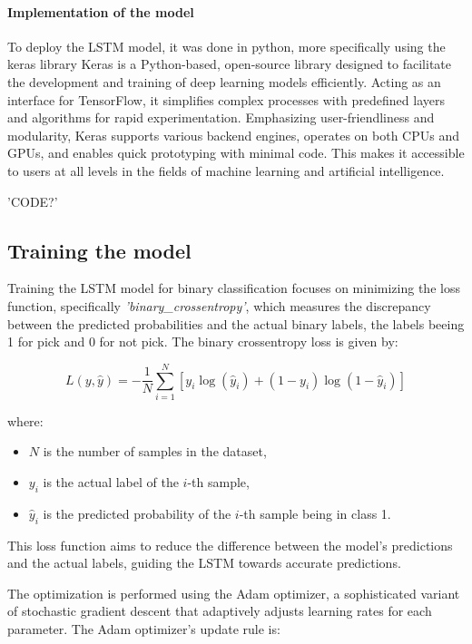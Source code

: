 \paragraph{Implementation of the model}
To deploy the LSTM model, it was done in python, more specifically using the keras library
Keras \cite{chollet2015keras} is a Python-based, open-source library designed to facilitate the development and training of deep learning models efficiently.
Acting as an interface for TensorFlow, it simplifies complex processes with predefined layers and algorithms for rapid experimentation. 
Emphasizing user-friendliness and modularity, Keras supports various backend engines, operates on both CPUs and GPUs, and enables quick prototyping with minimal code. 
This makes it accessible to users at all levels in the fields of machine learning and artificial intelligence.


'CODE?'





\subsection{Training the model}

Training the LSTM model for binary classification focuses on minimizing the loss function, specifically \textit{'binary\_crossentropy'}, which measures the discrepancy between the predicted probabilities and the actual binary labels, the labels beeing 1 for pick and 0 for not pick. 
The binary crossentropy loss is given by:

\[
L(y, \hat{y}) = -\frac{1}{N} \sum_{i=1}^{N} \left[ y_i \log(\hat{y}_i) + (1 - y_i) \log(1 - \hat{y}_i) \right]
\]

where:
\begin{itemize}
    \item $N$ is the number of samples in the dataset,
    \item $y_i$ is the actual label of the $i$-th sample,
    \item $\hat{y}_i$ is the predicted probability of the $i$-th sample being in class 1.
\end{itemize}

This loss function aims to reduce the difference between the model's predictions and the actual labels, guiding the LSTM towards accurate predictions.

The optimization is performed using the Adam optimizer, a sophisticated variant of stochastic gradient descent that adaptively adjusts learning rates for each parameter. 
The Adam optimizer's update rule is:

